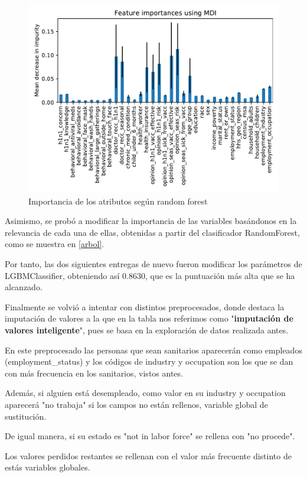 \documentclass[twoside,openright,titlepage,numbers=noenddot,openany,headinclude,footinclude=true,
cleardoublepage=empty,abstractoff,BCOR=5mm,paper=a4,fontsize=12pt,main=spanish]{scrreprt}
\begin{document}
\begin{figure}[H]
\includegraphics[scale=1]{atributos.pdf}
\caption{Importancia de los atributos según random forest}
\label{arbol}
\end{figure}

Asimismo, se probó a modificar la importancia de las variables basándonos en la relevancia de cada una de ellas, obtenidas a partir del clasificador RandomForest, como se muestra en \eqref{arbol}.

Por tanto, las dos siguientes entregas de nuevo fueron modificar los parámetros de LGBMClassifier, obteniendo así 0.8630, que es la puntuación más alta que se ha alcanzado.

Finalmente se volvió a intentar con distintos preprocesados, donde destaca la imputación de valores a la que en la tabla nos referimos como "\textbf{imputación de valores inteligente}", pues se basa en la exploración de datos realizada antes.

En este preprocesado las personas que sean sanitarios aparecerán como empleados (employment\_status) y los códigos de industry y occupation son los que se dan con más frecuencia en los sanitarios, vistos antes.

Además, si alguien está desempleado, como valor en su industry y occupation aparecerá "no trabaja" si los campos no están rellenos, variable global de sustitución.

De igual manera, si su estado es "not in labor force" se rellena con "no procede".

Los valores perdidos restantes se rellenan con el valor  más frecuente distinto de estás variables globales.
\end{document}
